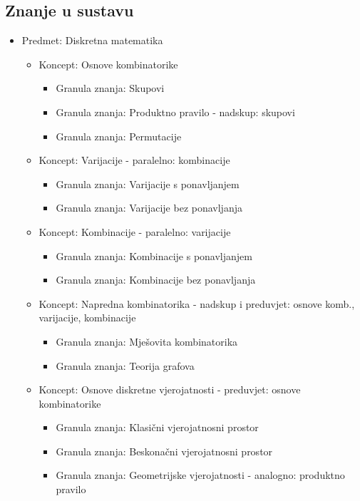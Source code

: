 \documentclass[times, utf8, zavrsni, numeric]{fer}
\begin{document}
\pagebreak
\subsection{Znanje u sustavu}
\begin{itemize}
	\item Predmet: Diskretna matematika
	\begin{itemize}
		\item Koncept: Osnove kombinatorike
		\begin{itemize}
			\item Granula znanja: Skupovi
			\item Granula znanja: Produktno pravilo
			\newline - nadskup: skupovi
			\item Granula znanja: Permutacije
		\end{itemize}
		\item Koncept: Varijacije - paralelno: kombinacije
		\begin{itemize}
			\item Granula znanja: Varijacije s ponavljanjem
			\item Granula znanja: Varijacije bez ponavljanja
		\end{itemize}
		\item Koncept: Kombinacije - paralelno: varijacije
		\begin{itemize}
			\item Granula znanja: Kombinacije s ponavljanjem
			\item Granula znanja: Kombinacije bez ponavljanja
		\end{itemize}
		\item Koncept: Napredna kombinatorika
		\newline - nadskup i preduvjet: osnove komb., varijacije, kombinacije
		\begin{itemize}
			\item Granula znanja: Mješovita kombinatorika
			\item Granula znanja: Teorija grafova
		\end{itemize}
		\item Koncept: Osnove diskretne vjerojatnosti
		\newline - preduvjet: osnove kombinatorike
		\begin{itemize}
			\item Granula znanja: Klasični vjerojatnosni prostor
			\item Granula znanja: Beskonačni vjerojatnosni prostor
			\item Granula znanja: Geometrijske vjerojatnosti
			\newline - analogno: produktno pravilo
		\end{itemize}
	\end{itemize}
\end{itemize}
\end{document}
